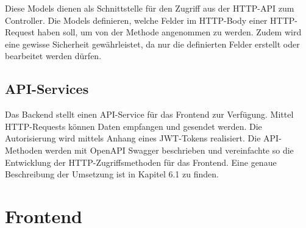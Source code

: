 Diese Models dienen als Schnittstelle für den Zugriff aus der HTTP-API zum Controller. Die Models definieren, welche Felder im HTTP-Body
einer HTTP-Request haben soll, um von der Methode angenommen zu werden. Zudem wird eine gewisse Sicherheit gewährleistet, da nur die definierten Felder 
erstellt oder bearbeitet werden dürfen.

\subsection{API-Services}
Das Backend stellt einen API-Service für das Frontend zur Verfügung. Mittel HTTP-Requests können Daten empfangen und gesendet werden. 
Die Autorisierung  wird mittels Anhang eines JWT-Tokens realisiert. Die API-Methoden werden mit OpenAPI Swagger beschrieben und vereinfachte so die Entwicklung 
der HTTP-Zugriffsmethoden für das Frontend. Eine genaue Beschreibung der Umsetzung ist in Kapitel 6.1 zu finden.

\newpage
\section{Frontend}


